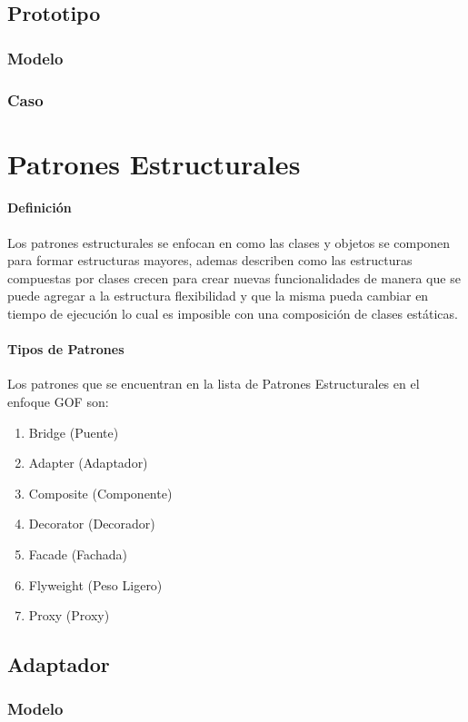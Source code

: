 \subsection{Prototipo}
\subsubsection{Modelo}
\newpage
\subsubsection{Caso}
\newpage

\section{Patrones Estructurales}
\paragraph{Definición}
Los patrones estructurales se enfocan en como las clases y objetos se componen para formar estructuras mayores, ademas describen como las estructuras compuestas por clases crecen para crear nuevas funcionalidades de manera que se puede agregar a la estructura flexibilidad y que la misma pueda cambiar en tiempo de ejecución lo cual es imposible con una composición de clases estáticas.
\paragraph{Tipos de Patrones}
Los patrones que se encuentran en la lista de Patrones Estructurales en el enfoque GOF son:
\begin{enumerate}
	\item Bridge (Puente)
	\item Adapter (Adaptador)
	\item Composite (Componente)
	\item Decorator (Decorador)
	\item Facade (Fachada)
	\item Flyweight (Peso Ligero) 
	\item Proxy (Proxy)
\end{enumerate}

\subsection{Adaptador}
\subsubsection{Modelo}
\newpage
